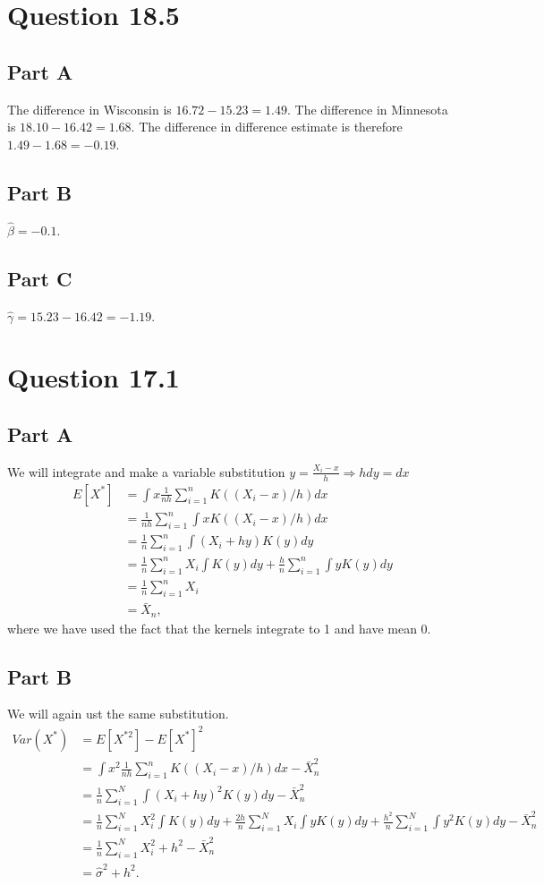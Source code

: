 \documentclass[11pt]{article} %
\begin{document}
\section{Question 18.5}
\subsection{Part A}
The difference in Wisconsin is $16.72 - 15.23 = 1.49$. The difference in Minnesota is $18.10-16.42 = 1.68$. The difference in difference estimate is therefore $1.49 - 1.68 = -0.19$.
\subsection{Part B}
$\hat{\beta} = -0.1$.
\subsection{Part C}
$\hat{\gamma} = 15.23 - 16.42 = -1.19.$

\section{Question 17.1}
\subsection{Part A}
We will integrate and make a variable substitution $y = \frac{X_i - x}{h}\Rightarrow h dy = dx$
\begin{align*}
E[X^*] &= \int x \frac{1}{nh} \sum_{i=1}^n K((X_i - x)/h) dx\\
&= \frac{1}{nh}\sum_{i=1}^n \int x K((X_i - x)/h) dx \\
&= \frac{1}{n}\sum_{i=1}^n \int (X_i + hy) K(y) dy  \\
&= \frac{1}{n}\sum_{i=1}^n X_i \int K(y) dy + \frac{h}{n}\sum_{i=1}^n \int y K(y) dy \\
&= \frac{1}{n}\sum_{i=1}^n X_i \\
&= \bar{X}_n,
\end{align*}
where we have used the fact that the kernels integrate to 1 and have mean 0.
\subsection{Part B}
We will again ust the same substitution.
\begin{align*}
Var(X^*) &= E[X^{*2}] - E[X^*]^2\\
&= \int x^2 \frac{1}{nh} \sum_{i=1}^n K((X_i - x)/h) dx -\bar{X}_n^2 \\
&= \frac{1}{n}\sum_{i=1}^N \int (X_i+hy)^2K(y)dy -\bar{X}_n^2\\
&= \frac{1}{n}\sum_{i=1}^N X_i^2 \int K(y)dy + \frac{2h}{n}\sum_{i=1}^N X_i \int yK(y)dy + \frac{h^2}{n}\sum_{i=1}^N \int y^2K(y)dy -\bar{X}_n^2\\
&= \frac{1}{n}\sum_{i=1}^N X_i^2  + h^2 - \bar{X}_n^2\\
&= \hat{\sigma}^2 + h^2.
\end{align*}
\end{document}
